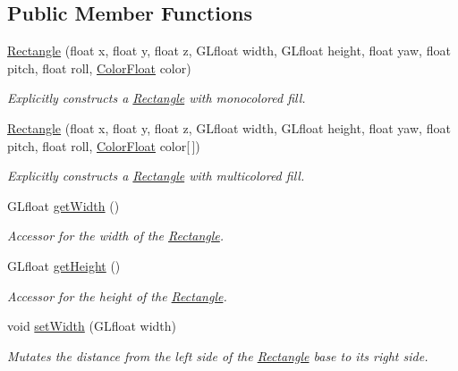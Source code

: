 \subsection*{Public Member Functions}
\begin{DoxyCompactItemize}
\item 
\hyperlink{classtsgl_1_1_rectangle_a9b33adc9b27c1e943d30c1730ed45fab}{Rectangle} (float x, float y, float z, G\+Lfloat width, G\+Lfloat height, float yaw, float pitch, float roll, \hyperlink{structtsgl_1_1_color_float}{Color\+Float} color)
\begin{DoxyCompactList}\small\item\em Explicitly constructs a \hyperlink{classtsgl_1_1_rectangle}{Rectangle} with monocolored fill. \end{DoxyCompactList}\item 
\hyperlink{classtsgl_1_1_rectangle_a4767afe522c73463ccbc65b0ac0a32b6}{Rectangle} (float x, float y, float z, G\+Lfloat width, G\+Lfloat height, float yaw, float pitch, float roll, \hyperlink{structtsgl_1_1_color_float}{Color\+Float} color\mbox{[}$\,$\mbox{]})
\begin{DoxyCompactList}\small\item\em Explicitly constructs a \hyperlink{classtsgl_1_1_rectangle}{Rectangle} with multicolored fill. \end{DoxyCompactList}\item 
G\+Lfloat \hyperlink{classtsgl_1_1_rectangle_ae2139384b6ceeab89c4297ed80835011}{get\+Width} ()
\begin{DoxyCompactList}\small\item\em Accessor for the width of the \hyperlink{classtsgl_1_1_rectangle}{Rectangle}. \end{DoxyCompactList}\item 
G\+Lfloat \hyperlink{classtsgl_1_1_rectangle_a17d9e87c9fc9a465e9b48eec226eb62e}{get\+Height} ()
\begin{DoxyCompactList}\small\item\em Accessor for the height of the \hyperlink{classtsgl_1_1_rectangle}{Rectangle}. \end{DoxyCompactList}\item 
void \hyperlink{classtsgl_1_1_rectangle_a85dd5be68f6f6101123b5659c8acff50}{set\+Width} (G\+Lfloat width)
\begin{DoxyCompactList}\small\item\em Mutates the distance from the left side of the \hyperlink{classtsgl_1_1_rectangle}{Rectangle} base to its right side. \end{DoxyCompactList}\item 

\end{DoxyCompactItemize}
